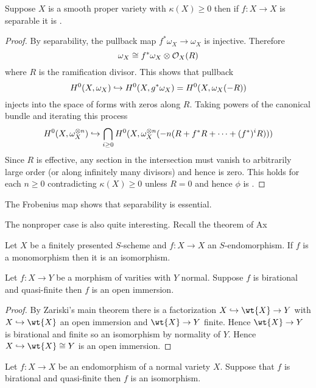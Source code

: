 \documentclass[12pt]{article}
\newcommand{\cO}{\mathcal{O}}
\begin{document}
\begin{prop}
Suppose $X$ is a smooth proper variety with $\kappa(X) \ge 0$ then if $f : X \to X$ is separable it is \etale.
\end{prop}

\begin{proof}
By separability, the pullback map $f^* \omega_X \to \omega_X$ is injective. Therefore
\[ \omega_X \cong f^* \omega_X \ot \cO_X(R) \]
where $R$ is the ramification divisor. This shows that pullback
\[ H^0(X, \omega_X) \hookrightarrow H^0(X, g^* \omega_X) = H^0(X, \omega_X(-R)) \]
injects into the space of forms with zeros along $R$. Taking powers of the canonical bundle and iterating this process
\[ H^0(X, \omega_X^{\otimes n}) \hookrightarrow \bigcap_{i \ge 0} H^0(X, \omega_X^{\otimes n}(-n (R + f^* R + \cdots + (f^*)^i R))) \]
Since $R$ is effective, any section in the intersection must vanish to arbitrarily large order (or along infinitely many divisors) and hence is zero. This holds for each $n \ge 0$ contradicting $\kappa(X) \ge 0$ unless $R = 0$ and hence $\phi$ is \etale. 
\end{proof}

\begin{rmk}
The Frobenius map shows that separability is essential. 
\end{rmk}


The nonproper case is also quite interesting. Recall the theorem of Ax
\begin{theorem}[Ax-Grothendieck]
Let $X$ be a finitely presented $S$-scheme and $f : X \to X$ an $S$-endomorphism. If $f$ is a monomorphism then it is an isomorphism.
\end{theorem}

\begin{prop}
Let $f : X \to Y$ be a morphism of varities with $Y$ normal. Suppose $f$ is birational and quasi-finite then $f$ is an open immersion. 
\end{prop}

\begin{proof}
By Zariski's main theorem there is a factorization $X \embed \wt{X} \to Y$ with $X \embed \wt{X}$ an open immersion and $\wt{X} \to Y$ finite. Hence $\wt{X} \to Y$ is birational and finite so an isomorphism by normality of $Y$. Hence $X \embed \wt{X} \cong Y$ is an open immersion.
\end{proof}

\begin{cor}
Let $f : X \to X$ be an endomorphism of a normal variety $X$. Suppose that $f$ is birational and quasi-finite then $f$ is an isomorphism.
\end{cor}
\end{document}
